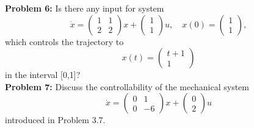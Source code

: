 \documentclass[12pt]{article}
\begin{document}
\noindent
\textbf{Problem 6:} Is there any input for system 
$$ \dot{x}=
\begin{pmatrix}
1 & 1 \\
2 & 2
\end{pmatrix} x + 
\begin{pmatrix}
1 \\
1
\end{pmatrix}u,\quad x(0)=
\begin{pmatrix}
1 \\
1
\end{pmatrix},$$
which controls the trajectory to 
$$x(t)=\begin{pmatrix}
t + 1 \\
1
\end{pmatrix}
$$
in the interval [0,1]? \\

\noindent
\textbf{Problem 7:} Discuss the controllability of the mechanical system
$$\dot{x}=
\begin{pmatrix}
	0 & 1 \\
	0 & -6
\end{pmatrix}	
x + 
\begin{pmatrix}
0 \\
2
\end{pmatrix} u
$$
introduced in Problem 3.7.
\end{document}
